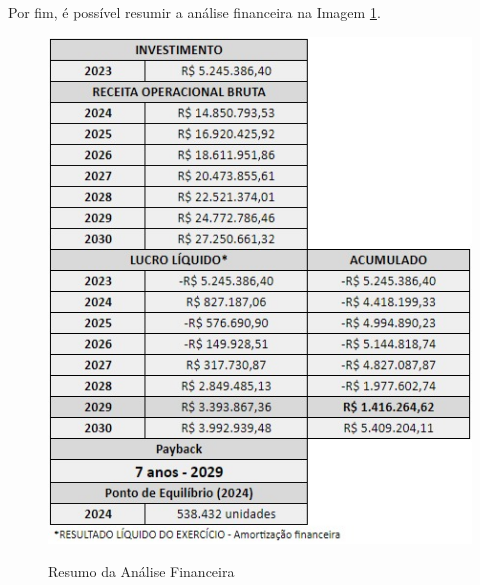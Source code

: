 \documentclass[
	12pt,				%
	openright,			%
	oneside,			%
	a4paper,			%
	english,			%
	french,				%
	spanish,			%
	brazil				%
	]{abntex2}
\begin{document}
Por fim, é possível resumir a análise financeira na Imagem \ref{res}. 

\begin{figure}[H]
\begin{center}
\caption{Resumo da Análise Financeira}
\includegraphics[scale=0.7]{a11.jpeg} 
\label{res}
\end{center}
\end{figure}



\end{document}
